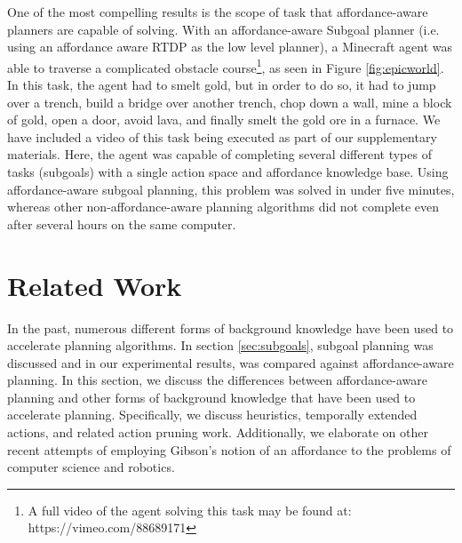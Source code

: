 \documentclass[]{article}
\begin{document}
One of the most compelling results is the scope of task that affordance-aware planners are capable of solving. With an affordance-aware Subgoal planner (i.e. using an affordance aware RTDP as the low level planner), a Minecraft agent was able to traverse a complicated obstacle course\footnote{A full video of the agent solving this task may be found at: https://vimeo.com/88689171}, as seen in Figure \ref{fig:epicworld}. In this task, the agent had to smelt gold, but in order to do so, it had to jump over a trench, build a bridge over another trench, chop down a wall, mine a block of gold, open a door, avoid lava, and finally smelt the gold ore in a furnace. We have included a video of this task being executed as part of our supplementary materials. Here, the agent was capable of completing several different types of tasks (subgoals) with a single action space and affordance knowledge base. Using affordance-aware subgoal
planning, this problem was solved in under five minutes, whereas other non-affordance-aware planning algorithms did not complete even after several hours on the same computer.

\section{Related Work}
In the past, numerous different forms of background knowledge have been used to 
accelerate planning algorithms. In section \ref{sec:subgoals}, subgoal
planning was discussed and in our experimental results, was compared against affordance-aware planning. 
In this section, we discuss the differences between affordance-aware planning and other
forms of background knowledge that have been used to accelerate planning.
Specifically, we discuss heuristics, temporally extended actions, and related action pruning work.
Additionally, we elaborate on other recent attempts of employing Gibson's notion of an affordance 
to the problems of computer science and robotics.
\end{document}
